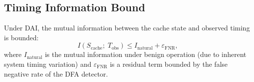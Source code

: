 \subsection{Timing Information Bound}
\label{sec:dai:bound}

\begin{theorem}
\label{thm:timing-bound}
Under DAI, the mutual information between the cache state and observed timing is bounded:
\begin{equation}
    I(S_{\mathrm{cache}};\; T_{\mathrm{obs}}) \leq I_{\mathrm{natural}} + \varepsilon_{\mathrm{FNR}},
\end{equation}
where $I_{\mathrm{natural}}$ is the mutual information under benign operation
(due to inherent system timing variation) and $\varepsilon_{\mathrm{FNR}}$ is a residual
term bounded by the false negative rate of the DFA detector.
\end{theorem}

